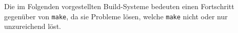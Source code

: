 Die im Folgenden vorgestellten Build-Systeme bedeuten einen Fortschritt
gegenüber von \texttt{make}, da sie Probleme lösen, welche \texttt{make} nicht
oder nur unzureichend löst.
